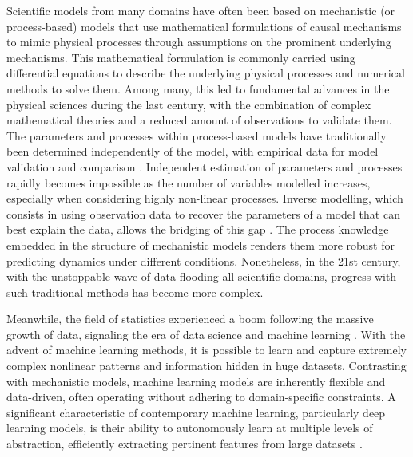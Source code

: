 
Scientific models from many domains have often been based on mechanistic (or process-based) models that use mathematical formulations of causal mechanisms to mimic physical processes through assumptions on the prominent underlying mechanisms\cite{rackauckas2020universal}. 
This mathematical formulation is commonly carried using differential equations to describe the underlying physical processes and numerical methods to solve them.
Among many, this led to fundamental advances in the physical sciences during the last century, with the combination of complex mathematical theories and a reduced amount of observations to validate them.
The parameters and processes within process-based models have traditionally been determined independently of the model, with empirical data for model validation and comparison \cite{hartig2012}.
Independent estimation of parameters and processes rapidly becomes impossible as the number of variables modelled increases, especially when considering highly non-linear processes. 
Inverse modelling, which consists in using observation data to recover the parameters of a model that can best explain the data, allows the bridging of this gap \cite{Wigner.1960, Rude:2018jv}. 
The process knowledge embedded in the structure of mechanistic models renders them more robust for predicting dynamics under different conditions.
Nonetheless, in the 21st century, with the unstoppable wave of data flooding all scientific domains, progress with such traditional methods has become more complex. 

Meanwhile, the field of statistics experienced a boom following the massive growth of data, signaling the era of data science and machine learning \cite{Cox:2017hv}.
With the advent of machine learning methods, it is possible to learn and capture extremely complex nonlinear patterns and information hidden in huge datasets. 
Contrasting with mechanistic models, machine learning models are inherently flexible and data-driven, often operating without adhering to domain-specific constraints. 
A significant characteristic of contemporary machine learning, particularly deep learning models, is their ability to autonomously learn at multiple levels of abstraction, efficiently extracting pertinent features from large datasets \cite{LeCun2015}.

